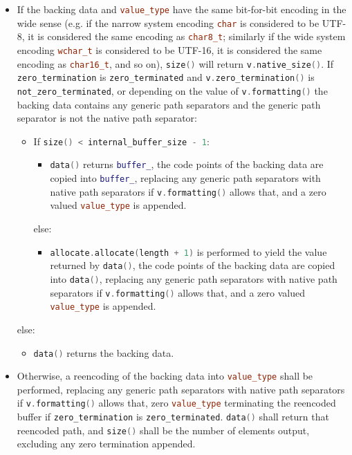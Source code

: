 \documentclass[11pt]{article}
\newcommand{\code}[2][cpp]{\lstinline[language=#1,basicstyle=\small\ttfamily]{#2}}
\begin{document}
\begin{itemize}
    \item If the backing data and \code{value_type} have the same bit-for-bit encoding in the wide sense (e.g. if the narrow system encoding \code{char} is considered to be UTF-8, it is considered the same encoding as \code{char8_t}; similarly if the wide system encoding \code{wchar_t} is considered to be UTF-16, it is considered the same encoding as \code{char16_t}, and so on), \code{size()} will return \code{v.native_size()}. If \code{zero_termination} is \code{zero_terminated} and \code{v.zero_termination()} is \code{not_zero_terminated}, or depending on the value of \code{v.formatting()} the backing data contains any generic path separators and the generic path separator is not the native path separator:
    \begin{itemize}
        \item If \code{size() < internal_buffer_size - 1}:
        \begin{itemize}
            \item \code{data()} returns \code{buffer_}, the code points of the backing data are copied into \code{buffer_}, replacing any generic path separators with native path separators if \code{v.formatting()} allows that, and a zero valued \code{value_type} is appended. 
        \end{itemize}
        else:
        \begin{itemize}
            \item \code{allocate.allocate(length + 1)} is performed to yield the value returned by \code{data()}, the code points of the backing data are copied into \code{data()}, replacing any generic path separators with native path separators if \code{v.formatting()} allows that, and a zero valued \code{value_type} is appended.
        \end{itemize}
    \end{itemize}
    else:
    \begin{itemize}
        \item \code{data()} returns the backing data.
    \end{itemize}

    \item Otherwise, a reencoding of the backing data into \code{value_type} shall be performed, replacing any generic path separators with native path separators if \code{v.formatting()} allows that, zero \code{value_type} terminating the reencoded buffer if \code{zero_termination} is \code{zero_terminated}. \code{data()} shall return that reencoded path, and \code{size()} shall be the number of elements output, excluding any zero termination appended.

\end{itemize}
\end{document}
